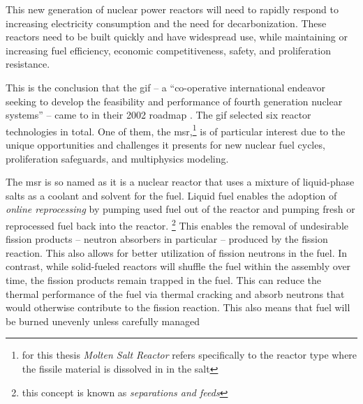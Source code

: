 %
This new generation of nuclear power reactors will need to rapidly respond to increasing
electricity consumption and the need for decarbonization. These reactors need
to be built quickly and have widespread use, while maintaining or increasing
fuel efficiency, economic competitiveness, safety, and proliferation resistance.

This is the conclusion that the \Gls{gif} -- a ``co-operative
international endeavor seeking to develop the feasibility and performance of
fourth generation nuclear systems'' \cite{gif_homepage} -- came to in their 2002
roadmap \cite{doe-ne_technology_2002}. The \Gls{gif} selected six reactor
technologies in total. One of them, the \Gls{msr},\footnote{for
this thesis {\it Molten Salt Reactor} refers specifically to the reactor type
where the fissile material is dissolved in in the salt} is of
particular interest due to the unique opportunities and challenges it presents
for new nuclear fuel cycles, proliferation safeguards, and multiphysics
modeling.

The \Gls{msr} is so named as it is a nuclear reactor that uses a mixture of
liquid-phase salts as a coolant and solvent for the fuel. Liquid fuel enables
the adoption of {\it online reprocessing} by pumping used fuel out of the
reactor and pumping fresh or reprocessed fuel back into the reactor.
\footnote{this concept is known as {\it separations and feeds}} This
enables the removal of undesirable fission products -- neutron absorbers in
particular -- produced by the fission reaction. This also allows for better
utilization of fission neutrons in the fuel. In contrast, while solid-fueled
reactors will shuffle the fuel within the assembly over time, the fission
products remain trapped in the fuel. This can reduce the thermal performance of
the fuel via thermal cracking and absorb neutrons that would otherwise
contribute to the fission reaction. This also means that fuel will be burned
unevenly unless carefully managed


